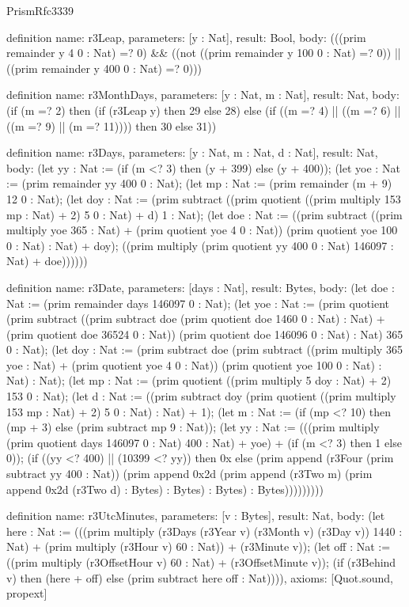\begin{lexlean}{PrismRfc3339}
\begin{semanticmodule}
definition{
  name: r3Leap,
  parameters: [y : Nat],
  result: Bool,
  body: (((prim remainder y 4 0 : Nat) =? 0) && ((not ((prim remainder y 100 0 : Nat) =? 0)) || ((prim remainder y 400 0 : Nat) =? 0)))
}

definition{
  name: r3MonthDays,
  parameters: [y : Nat, m : Nat],
  result: Nat,
  body: (if (m =? 2) then (if (r3Leap y) then 29 else 28) else (if ((m =? 4) || ((m =? 6) || ((m =? 9) || (m =? 11)))) then 30 else 31))
}

definition{
  name: r3Days,
  parameters: [y : Nat, m : Nat, d : Nat],
  result: Nat,
  body: (let yy : Nat := (if (m <? 3) then (y + 399) else (y + 400)); (let yoe : Nat := (prim remainder yy 400 0 : Nat); (let mp : Nat := (prim remainder (m + 9) 12 0 : Nat); (let doy : Nat := (prim subtract ((prim quotient ((prim multiply 153 mp : Nat) + 2) 5 0 : Nat) + d) 1 : Nat); (let doe : Nat := ((prim subtract ((prim multiply yoe 365 : Nat) + (prim quotient yoe 4 0 : Nat)) (prim quotient yoe 100 0 : Nat) : Nat) + doy); ((prim multiply (prim quotient yy 400 0 : Nat) 146097 : Nat) + doe))))))
}

definition{
  name: r3Date,
  parameters: [days : Nat],
  result: Bytes,
  body: (let doe : Nat := (prim remainder days 146097 0 : Nat); (let yoe : Nat := (prim quotient (prim subtract ((prim subtract doe (prim quotient doe 1460 0 : Nat) : Nat) + (prim quotient doe 36524 0 : Nat)) (prim quotient doe 146096 0 : Nat) : Nat) 365 0 : Nat); (let doy : Nat := (prim subtract doe (prim subtract ((prim multiply 365 yoe : Nat) + (prim quotient yoe 4 0 : Nat)) (prim quotient yoe 100 0 : Nat) : Nat) : Nat); (let mp : Nat := (prim quotient ((prim multiply 5 doy : Nat) + 2) 153 0 : Nat); (let d : Nat := ((prim subtract doy (prim quotient ((prim multiply 153 mp : Nat) + 2) 5 0 : Nat) : Nat) + 1); (let m : Nat := (if (mp <? 10) then (mp + 3) else (prim subtract mp 9 : Nat)); (let yy : Nat := (((prim multiply (prim quotient days 146097 0 : Nat) 400 : Nat) + yoe) + (if (m <? 3) then 1 else 0)); (if ((yy <? 400) || (10399 <? yy)) then 0x else (prim append (r3Four (prim subtract yy 400 : Nat)) (prim append 0x2d (prim append (r3Two m) (prim append 0x2d (r3Two d) : Bytes) : Bytes) : Bytes) : Bytes)))))))))
}

definition{
  name: r3UtcMinutes,
  parameters: [v : Bytes],
  result: Nat,
  body: (let here : Nat := (((prim multiply (r3Days (r3Year v) (r3Month v) (r3Day v)) 1440 : Nat) + (prim multiply (r3Hour v) 60 : Nat)) + (r3Minute v)); (let off : Nat := ((prim multiply (r3OffsetHour v) 60 : Nat) + (r3OffsetMinute v)); (if (r3Behind v) then (here + off) else (prim subtract here off : Nat)))),
  axioms: [Quot.sound, propext]
}


\end{semanticmodule}
\end{lexlean}

